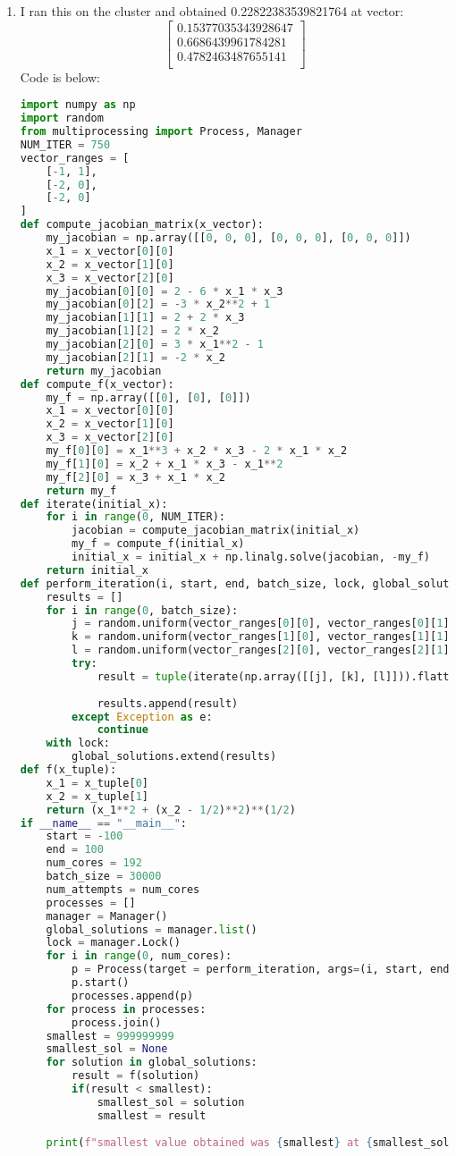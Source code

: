 \documentclass{article}
\begin{document}
\begin{enumerate}[label=\alph*.)]
\item I ran this on the cluster and obtained 0.22822383539821764 at vector: \\
\[
\begin{bmatrix}
0.15377035343928647\\
0.6686439961784281 \\
0.4782463487655141 \\
\end{bmatrix}
\]
Code is below: \\
\begin{lstlisting}[language=Python]
import numpy as np
import random
from multiprocessing import Process, Manager
NUM_ITER = 750
vector_ranges = [
    [-1, 1],
    [-2, 0],
    [-2, 0]
]
def compute_jacobian_matrix(x_vector):
    my_jacobian = np.array([[0, 0, 0], [0, 0, 0], [0, 0, 0]])
    x_1 = x_vector[0][0]
    x_2 = x_vector[1][0]
    x_3 = x_vector[2][0]
    my_jacobian[0][0] = 2 - 6 * x_1 * x_3
    my_jacobian[0][2] = -3 * x_2**2 + 1
    my_jacobian[1][1] = 2 + 2 * x_3
    my_jacobian[1][2] = 2 * x_2
    my_jacobian[2][0] = 3 * x_1**2 - 1
    my_jacobian[2][1] = -2 * x_2
    return my_jacobian
def compute_f(x_vector):
    my_f = np.array([[0], [0], [0]])
    x_1 = x_vector[0][0]
    x_2 = x_vector[1][0]
    x_3 = x_vector[2][0]
    my_f[0][0] = x_1**3 + x_2 * x_3 - 2 * x_1 * x_2
    my_f[1][0] = x_2 + x_1 * x_3 - x_1**2
    my_f[2][0] = x_3 + x_1 * x_2
    return my_f
def iterate(initial_x):
    for i in range(0, NUM_ITER):
        jacobian = compute_jacobian_matrix(initial_x)
        my_f = compute_f(initial_x)
        initial_x = initial_x + np.linalg.solve(jacobian, -my_f)
    return initial_x
def perform_iteration(i, start, end, batch_size, lock, global_solutions):
    results = []
    for i in range(0, batch_size):
        j = random.uniform(vector_ranges[0][0], vector_ranges[0][1])
        k = random.uniform(vector_ranges[1][0], vector_ranges[1][1])
        l = random.uniform(vector_ranges[2][0], vector_ranges[2][1])
        try:
            result = tuple(iterate(np.array([[j], [k], [l]])).flatten())
            
            results.append(result)
        except Exception as e:
            continue
    with lock:
        global_solutions.extend(results)
def f(x_tuple):
    x_1 = x_tuple[0]
    x_2 = x_tuple[1]
    return (x_1**2 + (x_2 - 1/2)**2)**(1/2)
if __name__ == "__main__":
    start = -100
    end = 100
    num_cores = 192
    batch_size = 30000
    num_attempts = num_cores
    processes = []
    manager = Manager()
    global_solutions = manager.list()
    lock = manager.Lock()
    for i in range(0, num_cores):
        p = Process(target = perform_iteration, args=(i, start, end, batch_size, lock, global_solutions))
        p.start()
        processes.append(p)
    for process in processes:
        process.join()
    smallest = 999999999
    smallest_sol = None
    for solution in global_solutions:
        result = f(solution)
        if(result < smallest):
            smallest_sol = solution
            smallest = result
    
    print(f"smallest value obtained was {smallest} at {smallest_sol}")
\end{lstlisting}
\end{enumerate}
\end{document}

